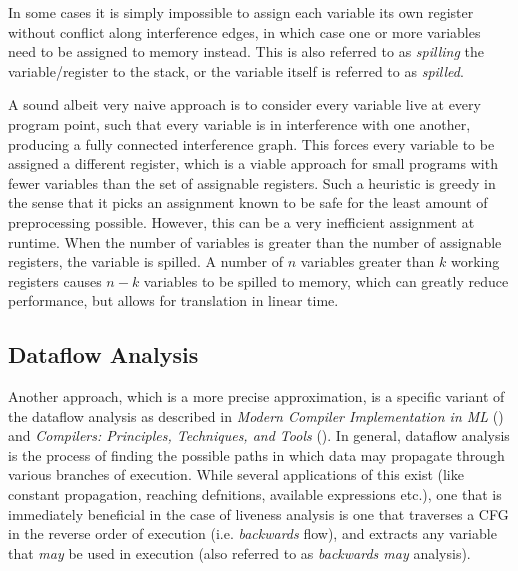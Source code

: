 \documentclass{article}
\begin{document}
In some cases it is simply impossible to assign each variable its own register without conflict along interference edges, in which case one or more variables need to be assigned to memory instead. This is also referred to as \textit{spilling} the variable/register to the stack, or the variable itself is referred to as \textit{spilled}.


A sound albeit very naive approach is to consider every variable live at every program point, such that every variable is in interference with one another, producing a fully connected interference graph.
This forces every variable to be assigned a different register, which is a viable approach for small programs with fewer variables than the set of assignable registers.
Such a heuristic is greedy in the sense that it picks an assignment known to be safe for the least amount of preprocessing possible. However, this can be a very inefficient assignment at runtime. 
When the number of variables is greater than the number of assignable registers, the variable is spilled. A number of \(n\)  variables greater than \(k\) working registers causes \(n-k\) variables to be spilled to memory, %
which can greatly reduce performance, but  allows for translation in linear time. %

\subsection{Dataflow Analysis}


Another approach, which is a more precise approximation, is a specific variant of the dataflow analysis as described in \textit{Modern Compiler Implementation in ML} (\cite{tiger}) and \textit{Compilers: Principles, Techniques, and Tools} (\cite{dragon}). In general, dataflow analysis is the process of finding the possible paths in which data may propagate through various branches of execution.  While several applications of this exist (like constant propagation, reaching defnitions, available expressions etc.), one that is immediately beneficial in the case of liveness analysis is one that traverses a CFG in the reverse order of execution (i.e.  \textit{backwards} flow), and extracts any variable that \textit{may} be used in execution (also referred to as \textit{backwards may} analysis). %
\end{document}

